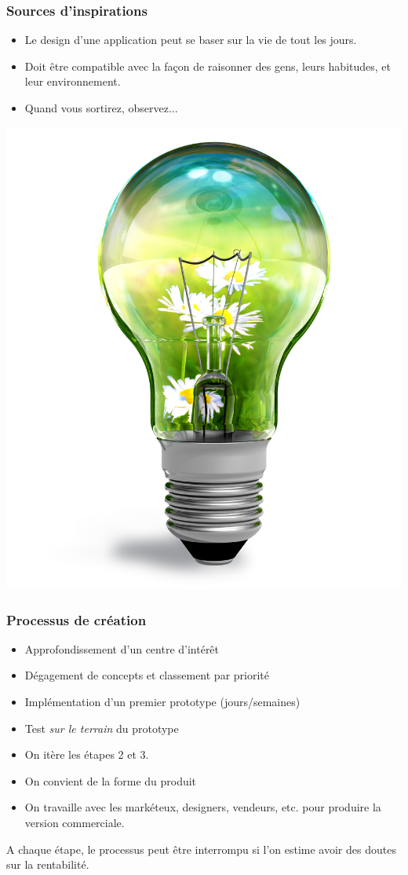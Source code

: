 \documentclass{beamer}
\begin{document}
\begin{frame}
\frametitle{Sources d'inspirations}
\begin{itemize}
	\item Le design d'une application peut se baser sur la vie de tout les jours.
	\item Doit être compatible avec la façon de raisonner des gens, leurs habitudes, et leur environnement.
	\item Quand vous sortirez, observez...
\end{itemize}
\begin{center}
\includegraphics[scale=0.1]{idea.jpg}
\end{center}
\end{frame}

\begin{frame}
\frametitle{Processus de création}
\begin{itemize}
	\item Approfondissement d'un centre d'intérêt
	\item Dégagement de concepts et classement par priorité
	\item Implémentation d'un premier prototype (jours/semaines)
	\item Test \emph{sur le terrain} du prototype
	\item On itère les étapes 2 et 3.
	\item On convient de la forme du produit
	\item On travaille avec les markéteux, designers, vendeurs, etc. pour produire la version commerciale.
\end{itemize}
A chaque étape, le processus peut être interrompu si l'on estime avoir des doutes sur la rentabilité.
\end{frame}
\end{document}
